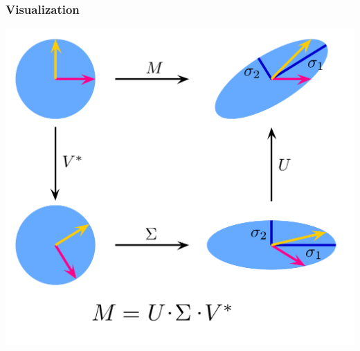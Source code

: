 \documentclass[aspectratio=169]{beamer}
\begin{document}
\begin{frame}
    \frametitle{Visualization}

    \begin{center}
        \includegraphics[height=0.9\textheight]{1024px-Singular-Value-Decomposition.svg.png}
    \end{center}
\end{frame}
\end{document}
